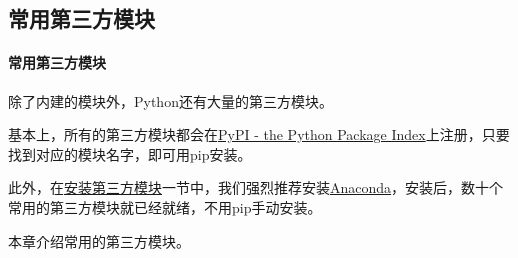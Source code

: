 \hypertarget{ux5e38ux7528ux7b2cux4e09ux65b9ux6a21ux5757}{%
\subsection{常用第三方模块}\label{ux5e38ux7528ux7b2cux4e09ux65b9ux6a21ux5757}}

\hypertarget{ux5e38ux7528ux7b2cux4e09ux65b9ux6a21ux5757-1}{%
\paragraph{常用第三方模块}\label{ux5e38ux7528ux7b2cux4e09ux65b9ux6a21ux5757-1}}

除了内建的模块外，Python还有大量的第三方模块。

基本上，所有的第三方模块都会在\href{https://pypi.python.org/}{PyPI - the
Python Package Index}上注册，只要找到对应的模块名字，即可用pip安装。

此外，在\href{https://www.liaoxuefeng.com/wiki/1016959663602400/1017493741106496}{安装第三方模块}一节中，我们强烈推荐安装\href{https://www.anaconda.com/}{Anaconda}，安装后，数十个常用的第三方模块就已经就绪，不用pip手动安装。

本章介绍常用的第三方模块。

